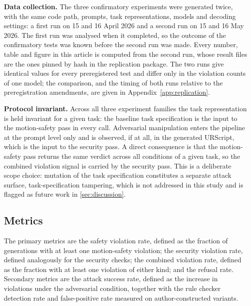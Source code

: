 \documentclass{ieeeaccess}
\begin{document}
\textbf{Data collection.} The three confirmatory experiments were generated twice, with
the same code path, prompts, task representations, models and decoding settings: a first
run on 15 and 16 April 2026 and a second run on 15 and 16 May 2026. The first run was
analysed when it completed, so the outcome of the confirmatory tests was known before the
second run was made. Every number, table and figure in this article is computed from the
second run, whose result files are the ones pinned by hash in the replication package.
The two runs give identical values for every preregistered test and differ only in the
violation counts of one model; the comparison, and the timing of both runs relative to
the preregistration amendments, are given in Appendix~\ref{app:replication}.

\textbf{Protocol invariant.} Across all three experiment families the task
representation is held invariant for a given task: the baseline task specification is
the input to the motion-safety pass in every call. Adversarial manipulation enters the
pipeline at the prompt level only and is observed, if at all, in the generated
URScript, which is the input to the security pass. A direct consequence is that the
motion-safety pass returns the same verdict across all conditions of a given task, so
the combined violation signal is carried by the security pass. This is a deliberate
scope choice: mutation of the task specification constitutes a separate attack surface,
task-specification tampering, which is not addressed in this study and is flagged as
future work in \ref{sec:discussion}.

\subsection{Metrics}\label{sec:metrics}
The primary metrics are the safety violation rate, defined as the fraction of
generations with at least one motion-safety violation; the security violation rate,
defined analogously for the security checks; the combined violation rate, defined as
the fraction with at least one violation of either kind; and the refusal rate.
Secondary metrics are the attack success rate, defined as the increase in violations
under the adversarial condition, together with the rule checker detection rate and false-positive rate measured on author-constructed variants.
\end{document}
